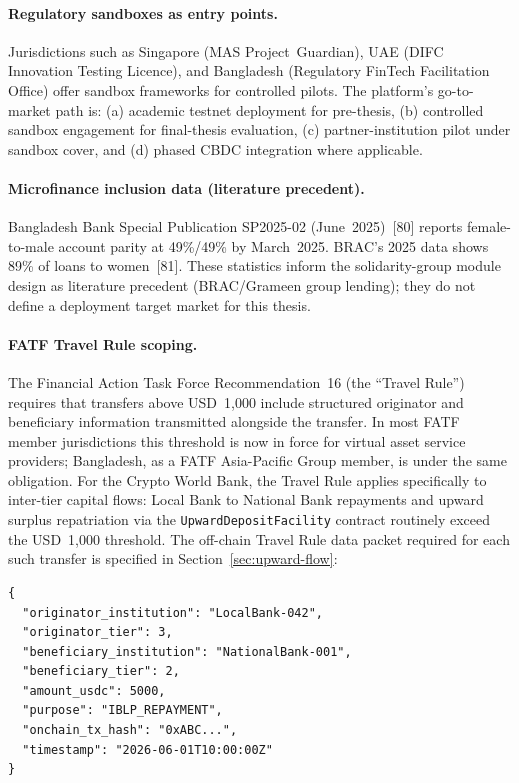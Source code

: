 \documentclass[12pt, a4paper]{report}
\begin{document}
\paragraph{Regulatory sandboxes as entry points.}
Jurisdictions such as Singapore (MAS Project~Guardian), UAE (DIFC Innovation Testing Licence), and Bangladesh (Regulatory FinTech Facilitation Office) offer sandbox frameworks for controlled pilots. The platform's go-to-market path is: (a) academic testnet deployment for pre-thesis, (b) controlled sandbox engagement for final-thesis evaluation, (c) partner-institution pilot under sandbox cover, and (d) phased CBDC integration where applicable.

\paragraph{Microfinance inclusion data (literature precedent).}
Bangladesh Bank Special Publication SP2025-02 (June~2025)~[80] reports female-to-male account parity at 49\%/49\% by March~2025. BRAC's 2025 data shows 89\% of loans to women~[81]. These statistics inform the solidarity-group module design as literature precedent (BRAC/Grameen group lending); they do not define a deployment target market for this thesis.

\paragraph{FATF Travel Rule scoping.}
The Financial Action Task Force Recommendation~16 (the ``Travel Rule'') requires that transfers above USD~1{,}000 include structured originator and beneficiary information transmitted alongside the transfer. In most FATF member jurisdictions this threshold is now in force for virtual asset service providers; Bangladesh, as a FATF Asia-Pacific Group member, is under the same obligation. For the Crypto World Bank, the Travel Rule applies specifically to inter-tier capital flows: Local Bank to National Bank repayments and upward surplus repatriation via the \texttt{UpwardDepositFacility} contract routinely exceed the USD~1{,}000 threshold. The off-chain Travel Rule data packet required for each such transfer is specified in Section~\ref{sec:upward-flow}:

\begin{verbatim}
{
  "originator_institution": "LocalBank-042",
  "originator_tier": 3,
  "beneficiary_institution": "NationalBank-001",
  "beneficiary_tier": 2,
  "amount_usdc": 5000,
  "purpose": "IBLP_REPAYMENT",
  "onchain_tx_hash": "0xABC...",
  "timestamp": "2026-06-01T10:00:00Z"
}
\end{verbatim}
\end{document}

